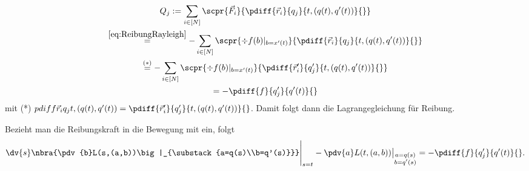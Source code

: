\documentclass[../WiSe22ANA3.tex]{subfiles}
\begin{document}
		\begin{multline*}
			Q_j:=\sum_{i\in[N]}\scpr{\vec F_i}{\pdiff{\vec r_i}{q_j}{t,(q(t),q'(t))}{}}\\
			\stackrel{\eqref{eq:ReibungRayleigh}}{=}-\sum_{i\in[N]}\scpr{\div f(b)|_{b=x'(t)}}{\pdiff{\vec r_i}{q_j}{t,(q(t),q'(t))}{}}
			\\\stackrel{(*)}{=}-\sum_{i\in[N]}\scpr{\div f(b)|_{b=x'(t)}}{\pdiff{\vec r'_i}{q'_j}{t,(q(t),q'(t))}{}} 
			\\=-\pdiff{f}{q'_j}{q'(t)}{} 
		\end{multline*}
		mit (*) $\\pdiff{\vec r_i}{q_j}{t,(q(t),q'(t))}{}=\pdiff{\vec r'_i}{q'_j}{t,(q(t),q'(t))}{}$. Damit folgt dann die Lagrangegleichung für Reibung.
		\begin{info}
			Bezieht man die Reibungskraft in die Bewegung mit ein, folgt 
			\begin{align*}
				\dv{s}\nbra{\pdv{b}L(s,(a,b))\big|_{\substack{a=q(s)\\b=q'(s)}}}\Bigg|_{s=t}-\pdv{a}L(t,(a,b))\big|_{\substack{a=q(s)\\b=q'(s)}}=-\pdiff{f}{q'_j}{q'(t)}{}.
			\end{align*}
		\end{info}
\end{document}
